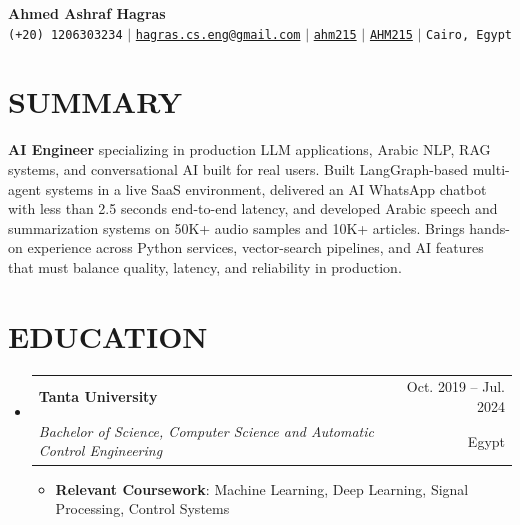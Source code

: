 \documentclass[letterpaper,11pt]{article}
\makeatletter
\newcommand{\resumeItem}[1]{
  \item\small{
    {#1 \vspace{-1pt}}
  }
}
\newcommand{\resumeSubheading}[4]{
  \vspace{-1pt}\item
    \begin{tabular*}{\textwidth}[t]{l@{\extracolsep{\fill}}r}
      \textbf{#1} & {\color{dark-grey}\small #2}\vspace{1pt}\\
      \textit{#3} & {\color{dark-grey} \small #4}\\
    \end{tabular*}\vspace{-4pt}
}
\newcommand{\resumeSubHeadingListStart}{\begin{itemize}[leftmargin=0in, label={}]}
\newcommand{\resumeSubHeadingListEnd}{\end{itemize}}
\newcommand{\resumeItemListStart}{\begin{itemize}}
\newcommand{\resumeItemListEnd}{\end{itemize}\vspace{0pt}}
\makeatother
\begin{document}
\begin{center}
    \textbf{\Huge Ahmed Ashraf Hagras} \\ \vspace{5pt}
    \small \faPhone* \texttt{(+20) 1206303234} \hspace{1pt} $|$
    \hspace{1pt} \faEnvelope \hspace{2pt} \href{mailto:hagras.cs.eng@gmail.com}{\texttt{hagras.cs.eng@gmail.com}} \hspace{1pt} $|$
    \hspace{1pt} \faLinkedin \hspace{2pt} \href{https://www.linkedin.com/in/ahm215}{\texttt{ahm215}} \hspace{1pt} $|$
    \hspace{1pt} \faGithub \hspace{2pt} \href{https://github.com/AHM215}{\texttt{AHM215}} \hspace{1pt} $|$
    \hspace{1pt} \faMapMarker* \hspace{2pt}\texttt{Cairo, Egypt}
    \\ \vspace{-3pt}
\end{center}

\section{SUMMARY}
\small{
\textbf{AI Engineer} specializing in production LLM applications, Arabic NLP, RAG systems, and conversational AI built for real users. Built LangGraph-based multi-agent systems in a live SaaS environment, delivered an AI WhatsApp chatbot with less than 2.5 seconds end-to-end latency, and developed Arabic speech and summarization systems on 50K+ audio samples and 10K+ articles. Brings hands-on experience across Python services, vector-search pipelines, and AI features that must balance quality, latency, and reliability in production.
}

\section{EDUCATION}
  \resumeSubHeadingListStart
    \resumeSubheading
      {Tanta University}{Oct. 2019 -- Jul. 2024}
      {Bachelor of Science, Computer Science and Automatic Control Engineering}{Egypt}
      \resumeItemListStart
        \resumeItem{\textbf{Relevant Coursework}: Machine Learning, Deep Learning, Signal Processing, Control Systems}
      \resumeItemListEnd
  \resumeSubHeadingListEnd
\end{document}
